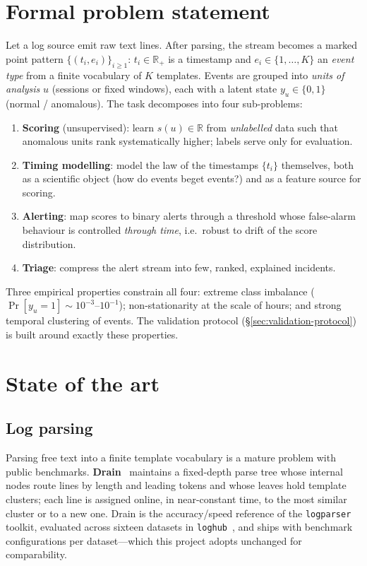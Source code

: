 \documentclass[11pt,a4paper]{report}
\newcommand{\keyword}[1]{\textbf{\color{accent2}#1}}
\newcommand{\code}[1]{\texttt{\small #1}}
\begin{document}
\section{Formal problem statement}
\label{sec:problem}
Let a log source emit raw text lines. After parsing, the stream becomes a
marked point pattern $\{(t_i,e_i)\}_{i\ge1}$: $t_i\in\mathbb{R}_+$ is a
timestamp and $e_i\in\{1,\dots,K\}$ an \emph{event type} from a finite
vocabulary of $K$ templates. Events are grouped into \emph{units of
analysis} $u$ (sessions or fixed windows), each with a latent state
$y_u\in\{0,1\}$ (normal / anomalous). The task decomposes into four
sub-problems:
\begin{enumerate}[nosep,leftmargin=1.6em]
  \item \textbf{Scoring} (unsupervised): learn $s(u)\in\mathbb{R}$ from
  \emph{unlabelled} data such that anomalous units rank systematically
  higher; labels serve only for evaluation.
  \item \textbf{Timing modelling}: model the law of the timestamps
  $\{t_i\}$ themselves, both as a scientific object (how do events beget
  events?) and as a feature source for scoring.
  \item \textbf{Alerting}: map scores to binary alerts through a threshold
  whose false-alarm behaviour is controlled \emph{through time}, i.e.\
  robust to drift of the score distribution.
  \item \textbf{Triage}: compress the alert stream into few, ranked,
  explained incidents.
\end{enumerate}
Three empirical properties constrain all four: extreme class imbalance
($\Pr[y_u{=}1]\sim10^{-3}$--$10^{-1}$); non-stationarity at the scale of
hours; and strong temporal clustering of events. The validation protocol
(\S\ref{sec:validation-protocol}) is built around exactly these properties.

\section{State of the art}
\label{sec:sota}

\subsection{Log parsing}
Parsing free text into a finite template vocabulary is a mature problem
with public benchmarks. \keyword{Drain}~\cite{drain} maintains a
fixed-depth parse tree whose internal nodes route lines by length and
leading tokens and whose leaves hold template clusters; each line is
assigned online, in near-constant time, to the most similar cluster or to a
new one. Drain is the accuracy/speed reference of the \code{logparser}
toolkit, evaluated across sixteen datasets in \code{loghub}~\cite{loghub},
and ships with benchmark configurations per dataset---which this project
adopts unchanged for comparability.
\end{document}
